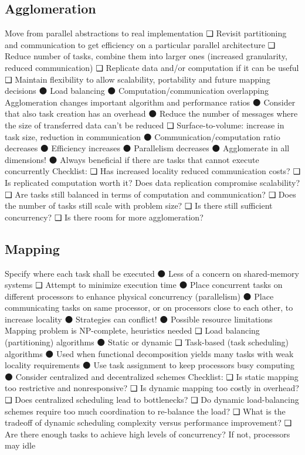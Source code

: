 \subsection{Agglomeration}
Move from parallel abstractions to real
implementation
❑ Revisit partitioning and communication to get
efficiency on a particular parallel architecture
❑ Reduce number of tasks, combine them into larger
ones (increased granularity, reduced
communication)
❑ Replicate data and/or computation if it can be useful
❑ Maintain flexibility to allow scalability, portability and
future mapping decisions
⚫ Load balancing
⚫ Computation/communication overlapping
Agglomeration changes important algorithm and
performance ratios
⚫ Consider that also task creation has an overhead
⚫ Reduce the number of messages where the size of
transferred data can’t be reduced
❑ Surface-to-volume: increase in task size, reduction in
communication
⚫ Communication/computation ratio decreases
⚫ Efficiency increases
⚫ Parallelism decreases
⚫ Agglomerate in all dimensions!
⚫ Always beneficial if there are tasks that cannot
execute concurrently
Checklist:
❑ Has increased locality reduced communication
costs?
❑ Is replicated computation worth it? Does data
replication compromise scalability?
❑ Are tasks still balanced in terms of computation
and communication?
❑ Does the number of tasks still scale with problem
size?
❑ Is there still sufficient concurrency?
❑ Is there room for more agglomeration?

\subsection{Mapping}
Specify where each task shall be executed
⚫ Less of a concern on shared-memory systems
❑ Attempt to minimize execution time
⚫ Place concurrent tasks on different processors to
enhance physical concurrency (parallelism)
⚫ Place communicating tasks on same processor, or
on processors close to each other, to increase
locality
⚫ Strategies can conflict!
⚫ Possible resource limitations
Mapping problem is NP-complete, heuristics needed
❑ Load balancing (partitioning) algorithms
⚫ Static or dynamic
❑ Task-based (task scheduling) algorithms
⚫ Used when functional decomposition yields many
tasks with weak locality requirements
⚫ Use task assignment to keep processors busy
computing
⚫ Consider centralized and decentralized schemes
Checklist:
❑ Is static mapping too restrictive and nonresponsive?
❑ Is dynamic mapping too costly in overhead?
❑ Does centralized scheduling lead to bottlenecks?
❑ Do dynamic load-balancing schemes require too
much coordination to re-balance the load?
❑ What is the tradeoff of dynamic scheduling
complexity versus performance improvement?
❑ Are there enough tasks to achieve high levels of
concurrency? If not, processors may idle